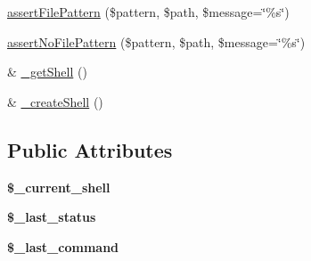 \begin{DoxyCompactItemize}
\item 
\hyperlink{class_shell_test_case_a431dc8207ce018d6d6f48f35d30e9f8e}{assertFilePattern} (\$pattern, \$path, \$message=\char`\"{}\%s\char`\"{})
\item 
\hyperlink{class_shell_test_case_a11e982abca8dcdc022aecef4866a31b1}{assertNoFilePattern} (\$pattern, \$path, \$message=\char`\"{}\%s\char`\"{})
\item 
\& \hyperlink{class_shell_test_case_a51aeeea213f51d1f4b17173fd507d782}{\_\-getShell} ()
\item 
\& \hyperlink{class_shell_test_case_a0f75705b8a86cd6dfbe7d38a040e53e4}{\_\-createShell} ()
\end{DoxyCompactItemize}
\subsection*{Public Attributes}
\begin{DoxyCompactItemize}
\item 
\hypertarget{class_shell_test_case_a6bad5777c529156205780697b5e22934}{
{\bfseries \$\_\-current\_\-shell}}
\label{class_shell_test_case_a6bad5777c529156205780697b5e22934}

\item 
\hypertarget{class_shell_test_case_ae0cb066cfc0efd2a25fcf9089cce8b27}{
{\bfseries \$\_\-last\_\-status}}
\label{class_shell_test_case_ae0cb066cfc0efd2a25fcf9089cce8b27}

\item 
\hypertarget{class_shell_test_case_a672fcd93c29f0d592af9dd7da322d30e}{
{\bfseries \$\_\-last\_\-command}}
\label{class_shell_test_case_a672fcd93c29f0d592af9dd7da322d30e}

\end{DoxyCompactItemize}


